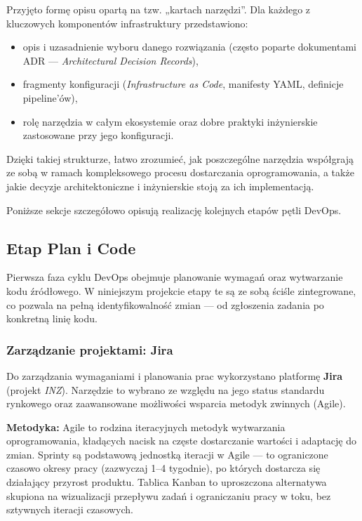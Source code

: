 Przyjęto formę opisu opartą na tzw. „kartach narzędzi”. Dla każdego z kluczowych komponentów infrastruktury przedstawiono:
\begin{itemize}
    \item opis i uzasadnienie wyboru danego rozwiązania (często poparte dokumentami ADR — \textit{Architectural Decision Records}),
    \item fragmenty konfiguracji (\textit{Infrastructure as Code}, manifesty YAML, definicje pipeline'ów),
    \item rolę narzędzia w całym ekosystemie oraz dobre praktyki inżynierskie zastosowane przy jego konfiguracji.
\end{itemize}

Dzięki takiej strukturze, łatwo zrozumieć, jak poszczególne narzędzia współgrają ze sobą w ramach kompleksowego procesu dostarczania oprogramowania, a także jakie decyzje architektoniczne i inżynierskie stoją za ich implementacją.





Poniższe sekcje szczegółowo opisują realizację kolejnych etapów pętli DevOps.

\subsection{Etap Plan i Code}
Pierwsza faza cyklu DevOps obejmuje planowanie wymagań oraz wytwarzanie kodu źródłowego. W niniejszym projekcie etapy te są ze sobą ściśle zintegrowane, co pozwala na pełną identyfikowalność zmian — od zgłoszenia zadania po konkretną linię kodu.

\subsubsection{Zarządzanie projektami: Jira}
Do zarządzania wymaganiami i planowania prac wykorzystano platformę \textbf{Jira} (projekt \textit{INZ}). Narzędzie to wybrano ze względu na jego status standardu rynkowego oraz zaawansowane możliwości wsparcia metodyk zwinnych (Agile).

\textbf{Metodyka:}
Agile to rodzina iteracyjnych metodyk wytwarzania oprogramowania, kładących nacisk na częste dostarczanie wartości i adaptację do zmian. Sprinty są podstawową jednostką iteracji w Agile — to ograniczone czasowo okresy pracy (zazwyczaj 1--4 tygodnie), po których dostarcza się działający przyrost produktu. Tablica Kanban to uproszczona alternatywa skupiona na wizualizacji przepływu zadań i ograniczaniu pracy w toku, bez sztywnych iteracji czasowych.

